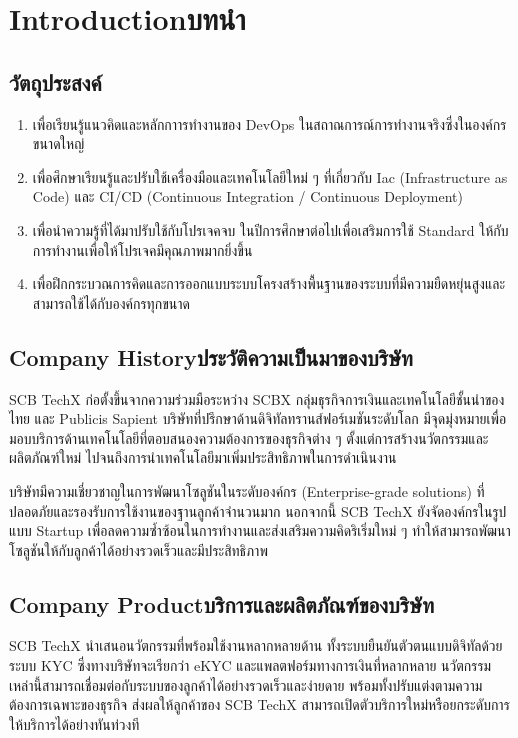 \chapter{\ifenglish Introduction\else บทนำ\fi}

\section{วัตถุประสงค์}
\begin{enumerate}
    \item เพื่อเรียนรู้แนวคิดและหลักกาารทำงานของ DevOps ในสถาณการณ์การทำงานจริงซึ่งในองค์กรขนาดใหญ่
    \item เพื่อศึกษาเรียนรู้และปรับใช้เครื่องมือและเทคโนโลยีใหม่ ๆ ที่เกี่ยวกับ Iac (Infrastructure as Code) และ CI/CD (Continuous Integration / Continuous Deployment)
    \item เพื่อนำความรู้ที่ได้มาปรับใช้กับโปรเจคจบ ในปีการศึกษาต่อไปเพื่อเสริมการใช้ Standard ให้กับการทำงานเพื่อให้โปรเจคมีคุณภาพมากยิ่งขึ้น
    \item เพื่อฝึกกระบวณการคิดและการออกแบบระบบโครงสร้างพื้นฐานของระบบที่มีความยืดหยุ่นสูงและสามารถใช้ได้กับองค์กรทุกขนาด

\end{enumerate}

\section{\ifenglish Company History\else ประวัติความเป็นมาของบริษัท\fi}

SCB TechX \cite{techxWebsite} ก่อตั้งขึ้นจากความร่วมมือระหว่าง SCBX กลุ่มธุรกิจการเงินและเทคโนโลยีชั้นนำของไทย และ Publicis Sapient บริษัทที่ปรึกษาด้านดิจิทัลทรานส์ฟอร์เมชันระดับโลก มีจุดมุ่งหมายเพื่อมอบบริการด้านเทคโนโลยีที่ตอบสนองความต้องการของธุรกิจต่าง ๆ ตั้งแต่การสร้างนวัตกรรมและผลิตภัณฑ์ใหม่ ไปจนถึงการนำเทคโนโลยีมาเพิ่มประสิทธิภาพในการดำเนินงาน

บริษัทมีความเชี่ยวชาญในการพัฒนาโซลูชันในระดับองค์กร (Enterprise-grade solutions) ที่ปลอดภัยและรองรับการใช้งานของฐานลูกค้าจำนวนมาก นอกจากนี้ SCB TechX ยังจัดองค์กรในรูปแบบ Startup เพื่อลดความซ้ำซ้อนในการทำงานและส่งเสริมความคิดริเริ่มใหม่ ๆ ทำให้สามารถพัฒนาโซลูชันให้กับลูกค้าได้อย่างรวดเร็วและมีประสิทธิภาพ


\section{\ifenglish Company Product\else บริการและผลิตภัณฑ์ของบริษัท\fi}
SCB TechX นำเสนอนวัตกรรมที่พร้อมใช้งานหลากหลายด้าน \cite{techxProduct} ทั้งระบบยืนยันตัวตนแบบดิจิทัลด้วยระบบ KYC \cite{whatIsKYC} ซึ่งทางบริษัทจะเรียกว่า eKYC และแพลตฟอร์มทางการเงินที่หลากหลาย นวัตกรรมเหล่านี้สามารถเชื่อมต่อกับระบบของลูกค้าได้อย่างรวดเร็วและง่ายดาย พร้อมทั้งปรับแต่งตามความต้องการเฉพาะของธุรกิจ ส่งผลให้ลูกค้าของ SCB TechX สามารถเปิดตัวบริการใหม่หรือยกระดับการให้บริการได้อย่างทันท่วงที

